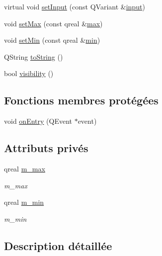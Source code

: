 \begin{DoxyCompactItemize}
\item 
virtual void \hyperlink{classSH__QuestionState_ab40b6202090d1afcc965e124b2deb88a}{set\-Input} (const Q\-Variant \&\hyperlink{classSH__InOutState_a8e1b78069343122df7713624a1a5a100}{input})
\item 
void \hyperlink{classSH__DecimalQuestionState_a5b7b0e27a5a89424c36e1bef77fdd062}{set\-Max} (const qreal \&\hyperlink{classSH__DecimalQuestionState_a17bd2b3f5766c5379d7f057d7d4aa178}{max})
\item 
void \hyperlink{classSH__DecimalQuestionState_a2b0fa48a8e0609bb2db7776ce1240a86}{set\-Min} (const qreal \&\hyperlink{classSH__DecimalQuestionState_ac909214eeb0e370c16718cb698bfec2c}{min})
\item 
Q\-String \hyperlink{classSH__GenericState_a7779babbb40f3f8faa71112204d9804f}{to\-String} ()
\item 
bool \hyperlink{classSH__InOutState_a3a18752c4122c26a2ebf38310c9c1b75}{visibility} ()
\end{DoxyCompactItemize}
\subsection*{Fonctions membres protégées}
\begin{DoxyCompactItemize}
\item 
void \hyperlink{classSH__GenericState_a68c67ef95738e01cd34cd5926f4932fb}{on\-Entry} (Q\-Event $\ast$event)
\end{DoxyCompactItemize}
\subsection*{Attributs privés}
\begin{DoxyCompactItemize}
\item 
qreal \hyperlink{classSH__DecimalQuestionState_a9f5763fb66d1c8c2fcdf6b5403d51579}{m\-\_\-max}
\begin{DoxyCompactList}\small\item\em m\-\_\-max \end{DoxyCompactList}\item 
qreal \hyperlink{classSH__DecimalQuestionState_a997b3644b15e2f221e5d68e2ce14a882}{m\-\_\-min}
\begin{DoxyCompactList}\small\item\em m\-\_\-min \end{DoxyCompactList}\end{DoxyCompactItemize}


\subsection{Description détaillée}



